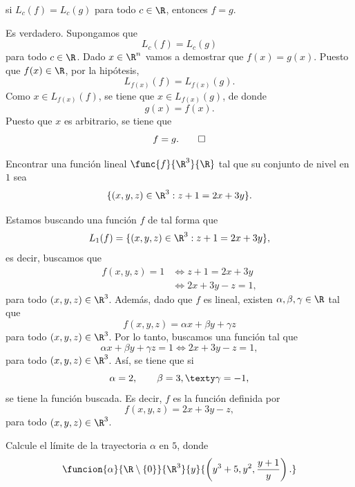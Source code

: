 \documentclass[a4,11pt]{aleph-examen}
\begin{document}
\begin{preguntas}
    si $L_c(f)=L_c(g)$ para todo $c\in\R$, entonces $f=g$. 

\begin{respuesta}
    Es verdadero. Supongamos que 
    \[
        L_c(f)=L_c(g) 
    \]
    para todo $c\in\R$. Dado $x\in\R^n$ vamos a demostrar que $f(x)=g(x)$. Puesto que $f(x)\in\R$, por la hipótesis,
    \[
        L_{f(x)}(f)=L_{f(x)}(g).
    \]
    Como $x\in L_{f(x)}(f)$, se tiene que $x\in L_{f(x)}(g)$, de donde
    \[
        g(x)=f(x).
    \]
    Puesto que $x$ es arbitrario, se tiene que
    \[
        f=g.\qedhere
    \]
\end{respuesta}

\item
    Encontrar una función lineal $\func{f}{\R^3}{\R}$ tal que su conjunto de nivel en $1$ sea
    \[
        \{(x,y,z)\in\R^3:z+1=2x+3y\}.
    \]

\begin{respuesta}
    Estamos buscando una función $f$ de tal forma que
    \[
        L_1(f)=\{(x,y,z)\in\R^3:z+1=2x+3y\},
    \]
    es decir, buscamos que
    \begin{align*}
        f(x,y,z)=1
            & \Longleftrightarrow z+1=2x+3y \\
            & \Longleftrightarrow 2x+3y-z=1,
    \end{align*}
    para todo $(x,y,z)\in\R^3$. Además, dado que $f$ es lineal, existen $\alpha, \beta, \gamma\in\R$ tal que
    \[
        f(x,y,z)=\alpha x + \beta y +\gamma z
    \]
    para todo $(x,y,z)\in\R^3$. Por lo tanto, buscamos una función tal que
    \[
        \alpha x + \beta y +\gamma z=1 \Longleftrightarrow 2x+3y-z=1,
    \]
    para todo $(x,y,z)\in\R^3$. Así, se tiene que si
    \[
        \alpha=2,
        \qquad
        \beta=3,
        \texty
        \gamma=-1,
    \]
    se tiene la función buscada. Es decir, $f$ es la función definida por
    \[
        f(x,y,z)=2x+3y-z,
    \]
    para todo $(x,y,z)\in\R^3$.
\end{respuesta}

\item
    Calcule el límite de la trayectoria $\alpha$ en $5$, donde
    \[
        \funcion{\alpha}{\R\setminus\{0\}}{\R^3}{y}
        {\left(y^3+5,y^2,\frac{y+1}{y}\right).}
    \]
    

\end{preguntas}
\end{document}
